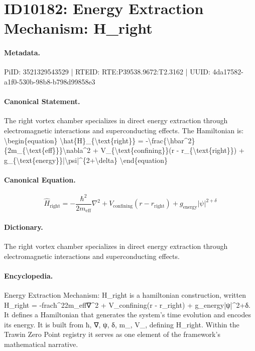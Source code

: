\section*{ID10182: Energy Extraction Mechanism: H\_right}
\paragraph{Metadata.}
PiID: 3521329543529 | RTEID: RTE:P39538.9672:T2.3162 | UUID: 4da17582-a1f0-530b-98b8-b798d99858e3

\paragraph{Canonical Statement.}
The right vortex chamber specializes in direct energy extraction through electromagnetic interactions and superconducting effects. The Hamiltonian is: \textbackslash{}begin\{equation\} \textbackslash{}hat\{H\}\_\{\textbackslash{}text\{right\}\} = -\textbackslash{}frac\{\textbackslash{}hbar\textasciicircum{}2\}\{2m\_\{\textbackslash{}text\{eff\}\}\}\textbackslash{}nabla\textasciicircum{}2 + V\_\{\textbackslash{}text\{confining\}\}(r - r\_\{\textbackslash{}text\{right\}\}) + g\_\{\textbackslash{}text\{energy\}\}|\textbackslash{}psi|\textasciicircum{}\{2+\textbackslash{}delta\} \textbackslash{}end\{equation\}

\paragraph{Canonical Equation.}
\[
\hat{H}_{\text{right}} = -\frac{\hbar^2}{2m_{\text{eff}}}\nabla^2 + V_{\text{confining}}(r - r_{\text{right}}) + g_{\text{energy}}|\psi|^{2+\delta}
\]

\paragraph{Dictionary.}
The right vortex chamber specializes in direct energy extraction through electromagnetic interactions and superconducting effects.

\paragraph{Encyclopedia.}
Energy Extraction Mechanism: H\_right is a hamiltonian construction, written H\_right = -fracħ\textasciicircum{}22m\_eff∇\textasciicircum{}2 + V\_confining(r - r\_right) + g\_energy|ψ|\textasciicircum{}2+δ. It defines a Hamiltonian that generates the system's time evolution and encodes its energy. It is built from ħ, ∇, ψ, δ, m\_, V\_, defining H\_right. Within the Trawin Zero Point registry it serves as one element of the framework's mathematical narrative.
